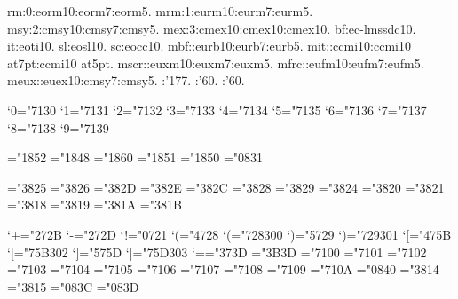 \newfont rm:0:eorm10:eorm7:eorm5.
\newmathfont mrm:1:eurm10:eurm7:eurm5.
\newmathfont msy:2:cmsy10:cmsy7:cmsy5.
\newmathfont mex:3:cmex10:cmex10:cmex10.
\newtextfont bf:ec-lmssdc10.
\newtextfont it:eoti10.
\newtextfont sl:eosl10.
\newtextfont sc:eocc10.
\newfam\mbffam \newfam\mitfam \newfam\mscrfam \newfam\mfrcfam \newfam\meuxfam
\newmathfont mbf:\mbffam:eurb10:eurb7:eurb5.
\newmathfont mit:\mitfam:ccmi10:ccmi10 at7pt:ccmi10 at5pt.
\newmathfont mscr:\mscrfam:euxm10:euxm7:euxm5.
\newmathfont mfrc:\mfrcfam:eufm10:eufm7:eufm5.
\newmathfont meux:\meuxfam:euex10:cmsy7:cmsy5.
:'177.
:'60.
\setskewchar \mscrfam:'60.

\mathcode`0="7130
\mathcode`1="7131
\mathcode`2="7132
\mathcode`3="7133
\mathcode`4="7134
\mathcode`5="7135
\mathcode`6="7136
\mathcode`7="7137
\mathcode`8="7138
\mathcode`9="7139

\mathchardef\intop="1852
\mathchardef\ointop="1848
\mathchardef\coprod="1860
\mathchardef\prod="1851
\mathchardef\sum="1850
\mathchardef\infty="0831

\mathchardef\nearrow="3825
\mathchardef\searrow="3826
\mathchardef\nwarrow="382D
\mathchardef\swarrow="382E
\mathchardef\Leftrightarrow="382C
\mathchardef\Leftarrow="3828
\mathchardef\Rightarrow="3829
\mathchardef\leftrightarrow="3824 
\mathchardef\leftarrow="3820 
\mathchardef\rightarrow="3821 
\def\uparrow{\delimiter"3822378 }
\def\downarrow{\delimiter"3823379 }
\def\updownarrow{\delimiter"386C33F }
\def\Uparrow{\delimiter"382A37E }
\def\Downarrow{\delimiter"382B37F }
\def\Updownarrow{\delimiter"386D377 }
\mathchardef\leftharpoonup="3818
\mathchardef\leftharpoondown="3819
\mathchardef\rightharpoonup="381A
\mathchardef\rightharpoondown="381B

\mathcode`+="272B
\mathcode`-="272D
\mathcode`!="0721
\mathcode`(="4728 \delcode`(="728300
\mathcode`)="5729 \delcode`)="729301
\mathcode`[="475B \delcode`[="75B302
\mathcode`]="575D \delcode`]="75D303
\mathcode`=="373D
\mathchardef\Relbar="3B3D %
\mathchardef\Gamma="7100
\mathchardef\Delta="7101
\mathchardef\Theta="7102
\mathchardef\Lambda="7103
\mathchardef\Xi="7104
\mathchardef\Pi="7105
\mathchardef\Sigma="7106
\mathchardef\Upsilon="7107
\mathchardef\Phi="7108
\mathchardef\Psi="7109
\mathchardef\Omega="710A
\let\varsigma=\sigma \let\varrho=\rho %
\mathchardef\aleph="0840
\def\rbrace{\delimiter"5867A09 } \let\}=\rbrace
\def\lbrace{\delimiter"4866A08 } \let\{=\lbrace
\mathchardef\leq="3814 \let\le=\leq
\mathchardef\geq="3815 \let\ge=\geq
\mathchardef\Re="083C
\mathchardef\Im="083D
\def\vert{\delimiter"86A30C }
\def\backslash{\delimiter"86E30F }

\rm
